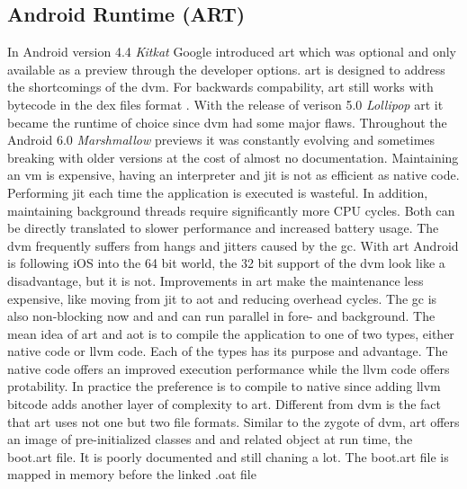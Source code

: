 \subsection{Android Runtime (ART)} \label{subsection:android-art}
In Android version 4.4 \textit{Kitkat} Google introduced \gls{art} which was optional and only available as a preview through the developer options.
\gls{art} is designed to address the shortcomings of the \gls{dvm}.
\newline
For backwards compability, \gls{art} still works with bytecode in the \gls{dex} files format \cite{androidArt}.
With the release of verison 5.0 \textit{Lollipop} \gls{art} it became the runtime of choice since \gls{dvm} had some major flaws.
Throughout the Android 6.0 \textit{Marshmallow} previews it was constantly evolving and sometimes breaking with older versions at the cost of almost no documentation.
\newline
Maintaining an \gls{vm} is expensive, having an interpreter and \gls{jit} is not as efficient as native code.
Performing \gls{jit} each time the application is executed is wasteful.
In addition, maintaining background threads require significantly more CPU cycles.
Both can be directly translated to slower performance and increased battery usage.
The \gls{dvm} frequently suffers from hangs and jitters caused by the \gls{gc}.
With \gls{art} Android is following iOS into the 64 bit world, the 32 bit support of the \gls{dvm} look like a disadvantage, but it is not.
\newline
Improvements in \gls{art} make the maintenance less expensive, like moving from \gls{jit} to \gls{aot} and reducing overhead cycles.
The \gls{gc} is also non-blocking now and and can run parallel in fore- and background.
\newline
The mean idea of \gls{art} and \gls{aot} is to compile the application to one of two types, either native code or \gls{llvm} code.
Each of the types has its purpose and advantage.
The native code offers an improved execution performance while the \gls{llvm} code offers protability.
In practice the preference is to compile to native since adding \gls{llvm} bitcode adds another layer of complexity to \gls{art}.
\newline
Different from \gls{dvm} is the fact that \gls{art} uses not one but two file formats.
Similar to the zygote of \gls{dvm}, \gls{art} offers an image of pre-initialized classes and and related object at run time, the boot.art file.
It is poorly documented and still chaning a lot.
The boot.art file is mapped in memory before the linked .oat file
